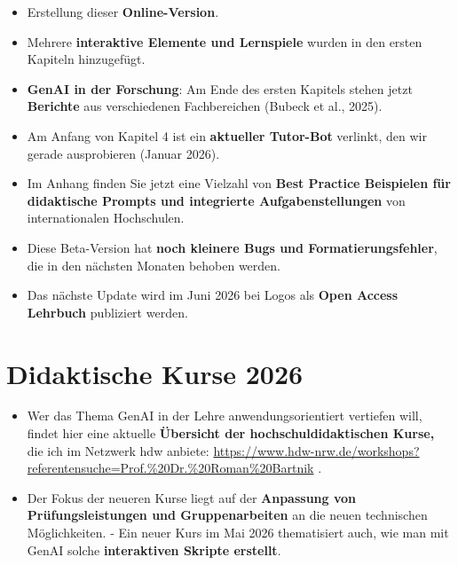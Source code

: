 \documentclass[
  ngerman,
  letterpaper,
  DIV=11]{scrreprt}
\providecommand{\tightlist}{%
  \setlength{\itemsep}{0pt}\setlength{\parskip}{0pt}}
\begin{document}

\begin{itemize}
\tightlist
\item
  Erstellung dieser \textbf{Online-Version}.
\item
  Mehrere \textbf{interaktive Elemente und Lernspiele} wurden in den
  ersten Kapiteln hinzugefügt.
\item
  \textbf{GenAI in der Forschung}: Am Ende des ersten Kapitels stehen
  jetzt \textbf{Berichte} aus verschiedenen Fachbereichen (Bubeck et
  al., 2025).
\item
  Am Anfang von Kapitel 4 ist ein \textbf{aktueller Tutor-Bot} verlinkt,
  den wir gerade ausprobieren (Januar 2026).
\item
  Im Anhang finden Sie jetzt eine Vielzahl von \textbf{Best Practice
  Beispielen für didaktische Prompts und integrierte Aufgabenstellungen}
  von internationalen Hochschulen.
\item
  Diese Beta-Version hat \textbf{noch kleinere Bugs und
  Formatierungsfehler}, die in den nächsten Monaten behoben werden.
\item
  Das nächste Update wird im Juni 2026 bei Logos als \textbf{Open Access
  Lehrbuch} publiziert werden.
\end{itemize}


\chapter*{Didaktische Kurse 2026}\label{didaktische-kurse-2026}


\begin{itemize}
\tightlist
\item
  Wer das Thema GenAI in der Lehre anwendungsorientiert vertiefen will,
  findet hier eine aktuelle \textbf{Übersicht der hochschuldidaktischen
  Kurse,} die ich im Netzwerk hdw anbiete:
  \url{https://www.hdw-nrw.de/workshops?referentensuche=Prof.\%20Dr.\%20Roman\%20Bartnik}
  .
\item
  Der Fokus der neueren Kurse liegt auf der \textbf{Anpassung von
  Prüfungsleistungen und Gruppenarbeiten} an die neuen technischen
  Möglichkeiten. - Ein neuer Kurs im Mai 2026 thematisiert auch, wie man
  mit GenAI solche \textbf{interaktiven Skripte erstellt}.
\end{itemize}
\end{document}
